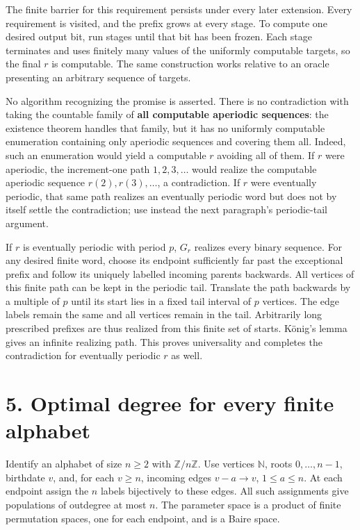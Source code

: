 \documentclass[
  11pt,
]{article}
\begin{document}
The finite barrier for this requirement persists under every later
extension. Every requirement is visited, and the prefix grows at every
stage. To compute one desired output bit, run stages until that bit has
been frozen. Each stage terminates and uses finitely many values of the
uniformly computable targets, so the final \(r\) is computable. The same
construction works relative to an oracle presenting an arbitrary
sequence of targets.

No algorithm recognizing the promise is asserted. There is no
contradiction with taking the countable family of \textbf{all computable
aperiodic sequences}: the existence theorem handles that family, but it
has no uniformly computable enumeration containing only aperiodic
sequences and covering them all. Indeed, such an enumeration would yield
a computable \(r\) avoiding all of them. If \(r\) were aperiodic, the
increment-one path \(1,2,3,\ldots\) would realize the computable
aperiodic sequence \(r(2),r(3),\ldots\), a contradiction. If \(r\) were
eventually periodic, that same path realizes an eventually periodic word
but does not by itself settle the contradiction; use instead the next
paragraph's periodic-tail argument.

If \(r\) is eventually periodic with period \(p\), \(G_r\) realizes
every binary sequence. For any desired finite word, choose its endpoint
sufficiently far past the exceptional prefix and follow its uniquely
labelled incoming parents backwards. All vertices of this finite path
can be kept in the periodic tail. Translate the path backwards by a
multiple of \(p\) until its start lies in a fixed tail interval of \(p\)
vertices. The edge labels remain the same and all vertices remain in the
tail. Arbitrarily long prescribed prefixes are thus realized from this
finite set of starts. König's lemma gives an infinite realizing path.
This proves universality and completes the contradiction for eventually
periodic \(r\) as well.

\section{5. Optimal degree for every finite
alphabet}\label{optimal-degree-for-every-finite-alphabet}

Identify an alphabet of size \(n\ge2\) with \(\mathbb Z/n\mathbb Z\).
Use vertices \(\mathbb N\), roots \(0,\ldots,n-1\), birthdate \(v\),
and, for each \(v\ge n\), incoming edges \(v-a\to v\), \(1\le a\le n\).
At each endpoint assign the \(n\) labels bijectively to these edges. All
such assignments give populations of outdegree at most \(n\). The
parameter space is a product of finite permutation spaces, one for each
endpoint, and is a Baire space.
\end{document}
